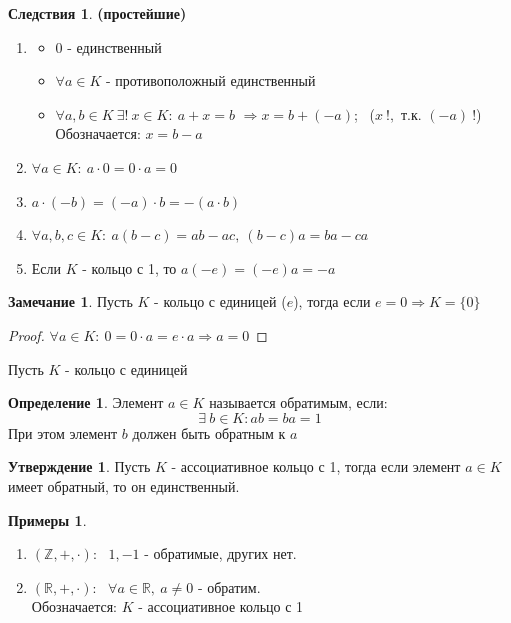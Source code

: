 \documentclass[a4paper, 12pt]{article}
\newcommand{\R}{\mathbb R}
\newcommand{\Z}{\mathbb Z}
\newcommand\tab[1][.5cm]{\hspace*{#1}}
\theoremstyle{definition}
\newtheorem*{definition}{Определение}
\newtheorem*{consequenses}{Следствия}
\newtheorem*{subtheorem}{Утверждение}
\newtheorem*{remark}{Замечание}
\newtheorem*{example}{Примеры}
\begin{document}
  \begin{consequenses} \textbf{(простейшие)} 
    \begin{enumerate}
      \item \begin{itemize}
        \item $0$ - единственный
        \item $\forall a\in K$ - противоположный единственный
        \item $\forall a, b\in K \ \exists! \ x \in K: \ a+x=b$ $\Longrightarrow  x = b+(-a)$; \  ($x \ !,$ т.к. $(-a) \ !$) \\   
        Обозначается: $x = b-a$ 
      \end{itemize}
      \item $\forall a \in K: \ a \cdot 0=0 \cdot a = 0$
      \item $a\cdot(-b) = (-a)\cdot b = -(a\cdot b)$  
      \item $\forall a, b, c \in K: \ a(b-c) = ab-ac, \ (b-c)a = ba-ca$ 
      \item Если $K$ - кольцо с 1, то $a(-e) = (-e)a = -a$ 
    \end{enumerate}
  \end{consequenses}
  \begin{remark}
    Пусть $K$ - кольцо с единицей ($e$), тогда если $e = 0 \Longrightarrow K = \{0\}$ 
  \end{remark}
  \begin{proof}
    $\forall a \in K: \ 0 = 0 \cdot a= e \cdot a \Longrightarrow a = 0$ 
  \end{proof} 
  Пусть $K$ - кольцо с единицей 
  \begin{definition}
      Элемент $a \in K$ называется обратимым, если: $$\exists \ b \in K: ab =ba = 1$$ 
      При этом элемент $b$ должен быть обратным к $a$   
  \end{definition}  
  \begin{subtheorem}
    Пусть $K$ - ассоциативное кольцо с 1, тогда если элемент $a \in K$ имеет обратный, то он единственный.  
  \end{subtheorem} 
  \begin{example} \tab
    \begin{enumerate}
      \item $(\Z, +, \cdot)$: \  $1, -1$ - обратимые, других нет.
      \item $(\R, +, \cdot)$: \ $\forall a \in \R, \ a \neq 0$ - обратим. \\
      Обозначается: $K$ - ассоциативное кольцо с 1  
    \end{enumerate}
  \end{example}
\end{document}
